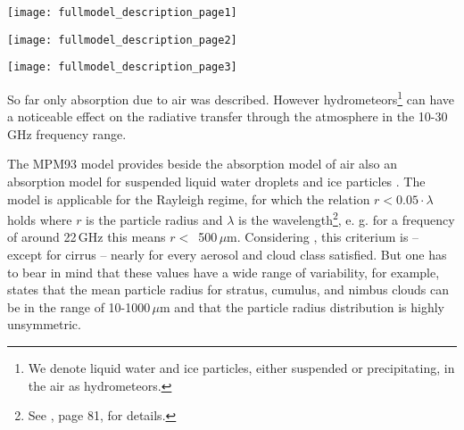 \begin{flushleft}
 \texttt{[image: fullmodel\_description\_page1]}
\end{flushleft}
\begin{flushleft}
 \texttt{[image: fullmodel\_description\_page2]}
\end{flushleft}
\begin{flushleft}
 \texttt{[image: fullmodel\_description\_page3]}
\end{flushleft}








\label{labela:cloudabsorption}

\label{levelb:lipartabs}
So far only absorption due to air was described. However 
hydrometeors\footnote{We denote liquid water and ice particles, either
  suspended or precipitating, in the air as hydrometeors.}
can have a noticeable effect on the radiative transfer through the
atmosphere in the 10-30\,GHz frequency range.

The MPM93 model provides beside the absorption model of air also an
absorption model for suspended liquid water droplets and ice particles
\citep{liebe:89b,liebeetal:91,hufford:91,liebeetal:93}.  The model is
applicable for the Rayleigh regime, for which the relation $r <
0.05\cdot \lambda$ holds where $r$ is the particle radius and
$\lambda$ is the wavelength\footnote{See \citet{brussaard:95}, page
  81, for details.}, e. g. for a frequency of around 22\,GHz 
this means $r<$~500\,$\mu$m. Considering \citet{salby:96}, this criterium is --
except for cirrus -- nearly for every aerosol and cloud class
satisfied. But one has to bear in mind that these values have a wide
range of variability, for example, \citet{salby:96} states that the
mean particle radius for stratus, cumulus, and nimbus clouds can be in
the range of 10-1000\,$\mu$m and that the particle radius distribution
is highly unsymmetric. 

